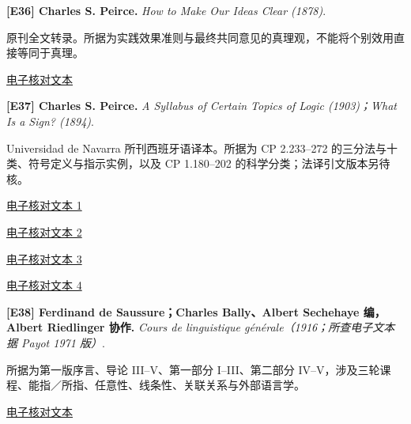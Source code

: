 \par\noindent\begin{minipage}{\linewidth}
\label{ref-36}\noindent\textbf{[E36] Charles S. Peirce.} \textit{How to Make Our Ideas Clear (1878)}.\par\nobreak
原刊全文转录。所据为实践效果准则与最终共同意见的真理观，不能将个别效用直接等同于真理。\par
{\small\href{https://en.wikisource.org/wiki/Popular_Science_Monthly/Volume_12/January_1878/Illustrations_of_the_Logic_of_Science_II}{电子核对文本}}\par
\par\end{minipage}\par

\par\noindent\begin{minipage}{\linewidth}
\label{ref-37}\noindent\textbf{[E37] Charles S. Peirce.} \textit{A Syllabus of Certain Topics of Logic (1903)；What Is a Sign? (1894)}.\par\nobreak
Universidad de Navarra 所刊西班牙语译本。所据为 CP 2.233–272 的三分法与十类、符号定义与指示实例，以及 CP 1.180–202 的科学分类；法译引文版本另待核。\par
{\small\href{https://www.unav.es/gep/RelacionesTriadicas.html}{电子核对文本 1}}\par
{\small\href{https://www.unav.es/gep/DiversasConcepcionesLogicas.html}{电子核对文本 2}}\par
{\small\href{https://www.unav.es/gep/AnOutlineClassification.html}{电子核对文本 3}}\par
{\small\href{https://www.unav.es/gep/Signo.html}{电子核对文本 4}}\par
\par\end{minipage}\par

\par\noindent\begin{minipage}{\linewidth}
\label{ref-38}\noindent\textbf{[E38] Ferdinand de Saussure；Charles Bally、Albert Sechehaye 编，Albert Riedlinger 协作.} \textit{Cours de linguistique générale（1916；所查电子文本据 Payot 1971 版）}.\par\nobreak
所据为第一版序言、导论 III–V、第一部分 I–III、第二部分 IV–V，涉及三轮课程、能指／所指、任意性、线条性、关联关系与外部语言学。\par
{\small\href{https://fr.wikisource.org/wiki/Cours_de_linguistique_g%C3%A9n%C3%A9rale/Texte_entier}{电子核对文本}}\par
\par\end{minipage}\par

